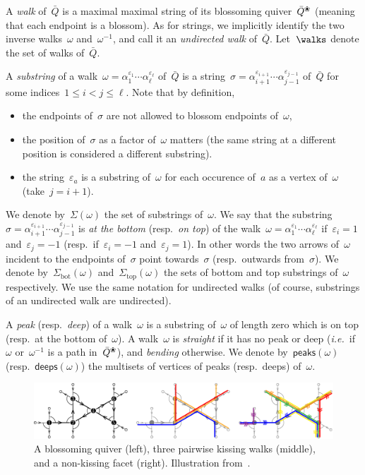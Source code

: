 \documentclass{amsart}
\theoremstyle{definition}
\newcommand{\ie}{\textit{i.e.}~} %
\newcommand{\darkblue}{\color{darkblue}} %
\newcommand{\defn}[1]{\textsl{\darkblue #1}} %
\newcommand{\quiver}{\bar Q} %
\newcommand{\blossom}{^\text{\ding{96}}} %
\renewcommand{\top}{\mathrm{top}} %
\newcommand{\bottom}{\mathrm{bot}} %
\newcommand{\peaks}[1]{\mathsf{peaks}(#1)} %
\newcommand{\deeps}[1]{\mathsf{deeps}(#1)} %
\begin{document}
A \defn{walk} of~$\quiver$ is a maximal maximal string of its blossoming quiver~$\quiver\blossom$ (meaning that each endpoint is a blossom).
As for strings, we implicitly identify the two inverse walks~$\omega$ and~$\omega^{-1}$, and call it an \defn{undirected walk} of~$\quiver$.
Let~$\walks$ denote the set of walks of~$\quiver$.

A \defn{substring} of a walk~$\omega = \alpha_1^{\varepsilon_1} \cdots \alpha_\ell^{\varepsilon_\ell}$ of~$\quiver$ is a string~$\sigma = \alpha_{i+1}^{\varepsilon_{i+1}} \cdots \alpha_{j-1}^{\varepsilon_{j-1}}$ of~$\quiver$ for some indices~$1 \le i < j \le \ell$. Note that by definition,
\begin{itemize}
\item the endpoints of~$\sigma$ are not allowed to blossom endpoints of~$\omega$,
\item the position of~$\sigma$ as a factor of~$\omega$ matters (the same string at a different position is considered a different substring).
\item the string~$\varepsilon_a$ is a substring of~$\omega$ for each occurence of~$a$ as a vertex of~$\omega$ (take~$j = i+1$).
\end{itemize}
We denote by~$\Sigma(\omega)$ the set of substrings of~$\omega$.
We say that the substring~$\sigma = \alpha_{i+1}^{\varepsilon_{i+1}} \cdots \alpha_{j-1}^{\varepsilon_{j-1}}$ is \defn{at the bottom} (resp.~\defn{on top}) of the walk~$\omega = \alpha_1^{\varepsilon_1} \cdots \alpha_\ell^{\varepsilon_\ell}$ if~$\varepsilon_i = 1$ and~$\varepsilon_j = -1$ (resp.~if~$\varepsilon_i = -1$ and~$\varepsilon_j = 1$).
In other words the two arrows of~$\omega$ incident to the endpoints of~$\sigma$ point towards~$\sigma$ (resp.~outwards from~$\sigma$).
We denote by~$\Sigma_\bottom(\omega)$ and~$\Sigma_\top(\omega)$ the sets of bottom and top substrings of~$\omega$ respectively.
We use the same notation for undirected walks (of course, substrings of an undirected walk are undirected).

A \defn{peak} (resp.~\defn{deep}) of a walk~$\omega$ is a substring of~$\omega$ of length zero which is on top (resp.~at the bottom of~$\omega$).
A walk~$\omega$ is \defn{straight} if it has no peak or deep (\ie if~$\omega$ or~$\omega^{-1}$ is a path in~$\quiver\blossom$), and \defn{bending} otherwise.
We denote by~$\peaks{\omega}$ (resp.~$\deeps{\omega}$) the multisets of vertices of peaks (resp.~deeps) of~$\omega$.

\begin{figure}[t]
	\capstart
	\centerline{\includegraphics[width=\textwidth]{exmNonkissing}}
	\caption{A blossoming quiver (left), three pairwise kissing walks (middle), and a non-kissing facet (right). Illustration from~\cite{PaluPilaudPlamondon-nonkissing}.}
	\label{fig:exmNonkissing}
\end{figure}
\end{document}

